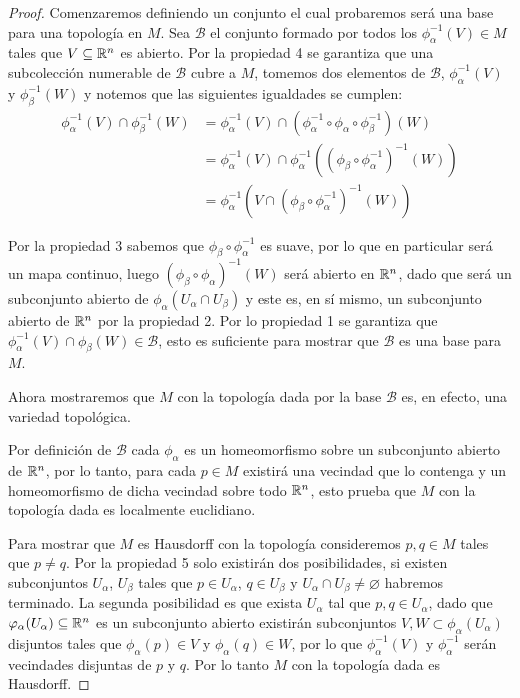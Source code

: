 \begin{proof}
	Comenzaremos definiendo un conjunto el cual probaremos será una base para una topología en $M$. Sea $\mathcal{B}$ el conjunto formado por todos los $\phi_{\alpha}^{-1}(V) \in M$ tales que $V \subseteq \mathbb{R}^n$ es abierto. Por la propiedad 4 se garantiza que una subcolección numerable de $\mathcal{B}$ cubre a $M$, tomemos dos elementos de $\mathcal{B}$, $\phi_{\alpha}^{-1}(V)$ y $\phi_{\beta}^{-1}(W)$ y notemos que las siguientes igualdades se cumplen:
	\begin{align*}
		\phi_{\alpha}^{-1}(V) \cap \phi_{\beta}^{-1}(W) & = \phi_{\alpha}^{-1}(V) \cap (\phi_{\alpha}^{-1} \circ \phi_{\alpha} \circ \phi_{\beta}^{-1})(W)  \\
		                                                & = \phi_{\alpha}^{-1}(V) \cap \phi_{\alpha}^{-1} ((\phi_{\beta} \circ \phi_{\alpha}^{-1})^{-1}(W)) \\
		                                                & = \phi_{\alpha}^{-1} (V \cap (\phi_{\beta} \circ \phi_{\alpha}^{-1})^{-1}(W))
	\end{align*}

	Por la propiedad 3 sabemos que $\phi_{\beta} \circ \phi_{\alpha}^{-1}$ es suave, por lo que en particular será un mapa continuo, luego $(\phi_{\beta} \circ \phi_{\alpha})^{-1}(W)$ será abierto en $\mathbb{R}^n$, dado que será un subconjunto abierto de $\phi_{\alpha}(U_{\alpha} \cap U_{\beta})$ y este es, en sí mismo, un subconjunto abierto de $\mathbb{R}^n$ por la propiedad 2. Por lo propiedad 1 se garantiza que $\phi_{\alpha}^{-1}(V) \cap \phi_{\beta}(W) \in \mathcal{B}$, esto es suficiente para mostrar que $\mathcal{B}$ es una base para $M$.

	Ahora mostraremos que $M$ con la topología dada por la base $\mathcal{B}$ es, en efecto, una variedad topológica.

	Por definición de $\mathcal{B}$ cada $\phi_{\alpha}$ es un homeomorfismo sobre un subconjunto abierto de $\mathbb{R}^n$, por lo tanto, para cada $p \in M$ existirá una vecindad que lo contenga y un homeomorfismo de dicha vecindad sobre todo $\mathbb{R}^n$, esto prueba que $M$ con la topología dada es localmente euclidiano.

	Para mostrar que $M$ es Hausdorff con la topología consideremos $p, q \in M$ tales que $p \neq q$. Por la propiedad 5 solo existirán dos posibilidades, si existen subconjuntos $U_{\alpha}$, $U_{\beta}$ tales que $p \in U_{\alpha}$, $q \in U_{\beta}$ y $U_{\alpha} \cap U_{\beta} \neq \varnothing$ habremos terminado. La segunda posibilidad es que exista $U_{\alpha}$ tal que $p, q \in U_{\alpha}$, dado que $\varphi_{\alpha}(U_{\alpha}) \subseteq \mathbb{R}^n$ es un subconjunto abierto existirán subconjuntos $V,W \subset \phi_{\alpha}(U_{\alpha})$ disjuntos tales que $\phi_{\alpha}(p) \in V$ y $\phi_{\alpha}(q) \in W$, por lo que $\phi_{\alpha}^{-1}(V)$ y $\phi_{\alpha}^{-1}$ serán vecindades disjuntas de $p$ y $q$. Por lo tanto $M$ con la topología dada es Hausdorff.


\end{proof}
